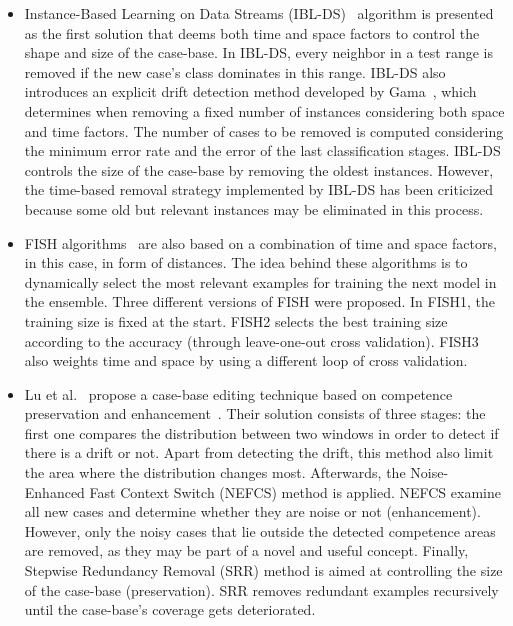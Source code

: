 \documentclass[preprint,12pt]{elsarticle}
\begin{document}
\begin{itemize}
	\item Instance-Based Learning on Data Streams (IBL-DS)~\cite{berin07} algorithm is presented as the first solution that deems both time and space factors to control the shape and size of the case-base. In IBL-DS, every neighbor in a test range is removed if the new case's class dominates in this range. IBL-DS also introduces an explicit drift detection method developed by Gama~\cite{gama04}, which determines when removing a fixed number of instances considering both space and time factors. The number of cases to be removed is computed considering the minimum error rate and the error of the last classification stages. IBL-DS controls the size of the case-base by removing the oldest instances. However, the time-based removal strategy implemented by IBL-DS has been criticized because some old but relevant instances may be eliminated in this process.
	\item FISH algorithms~\cite{zlio11} are also based on a combination of time and space factors, in this case, in form of distances. The idea behind these algorithms is to dynamically select the most relevant examples for training the next model in the ensemble. Three different versions of FISH were proposed. In FISH1, the training size is fixed at the start. FISH2 selects the best training size according to the accuracy (through leave-one-out cross validation). FISH3 also weights time and space by using a different loop of cross validation.	
	\item Lu et al.~\cite{lu16} propose a case-base editing technique based on competence preservation and enhancement~\cite{smyth95}. Their solution consists of three stages: the first one compares the distribution between two windows in order to detect if there is a drift or not. Apart from detecting the drift, this method also limit the area where the distribution changes most. Afterwards, the Noise-Enhanced Fast Context Switch (NEFCS) method is applied. NEFCS examine all new cases and determine whether they are noise or not (enhancement). However, only the noisy cases that lie outside the detected competence areas are removed, as they may be part of a novel and useful concept. Finally, Stepwise Redundancy Removal (SRR) method is aimed at controlling the size of the case-base (preservation). SRR removes redundant examples recursively until the case-base's coverage gets deteriorated.

\end{itemize}
\end{document}
